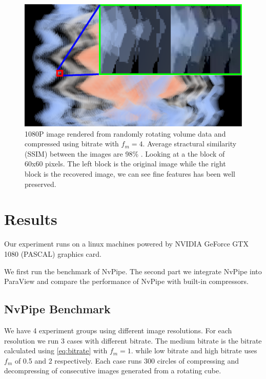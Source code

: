 \documentclass{vgtc}                          %
\begin{document}
\begin{figure}[h]
  \centering
  \includegraphics[width=\columnwidth]{quality.eps}
  \caption{1080P image rendered from randomly rotating volume data and compressed using bitrate with \(f_m=4\). Average stractural similarity (SSIM) between the images are 98\% \cite{wang2004image}. Looking at a the block of 60x60 pixels. The left block is the original image while the right block is the recovered image, we can see fine features has been well preserved. }
  \label{fig:quality}
\end{figure}

\section{Results}

Our experiment runs on a linux machines powered by NVIDIA GeForce GTX 1080 (PASCAL) graphics card.

We first run the benchmark of NvPipe. The second part we integrate NvPipe into ParaView and compare the performance of NvPipe with built-in compressors.

\subsection{NvPipe Benchmark}

We have 4 experiment groups using different image resolutions. For each resolution we run 3 cases with different bitrate. The medium bitrate is the bitrate calculated using \cref{eq:bitrate} with \(f_m = 1\). while low bitrate and high bitrate uses \(f_m\) of 0.5 and 2 respectively. Each case runs 300 circles of compressing and decompressing of consecutive images generated from a rotating cube.
\end{document}
